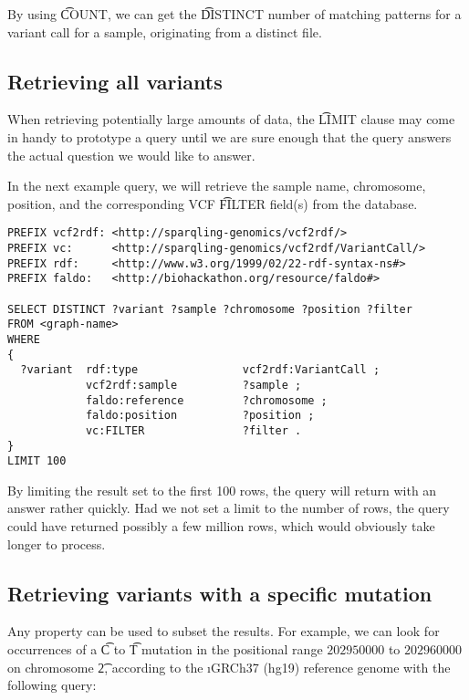   By using \t{COUNT}, we can get the \t{DISTINCT} number of
  matching patterns for a variant call for a sample, originating from
  a distinct file.

\subsection{Retrieving all variants}

  When retrieving potentially large amounts of data, the \t{LIMIT}
  clause may come in handy to prototype a query until we are sure enough
  that the query answers the actual question we would like to answer.

  In the next example query, we will retrieve the sample name,
  chromosome, position, and the corresponding VCF \t{FILTER} field(s)
  from the database.

\begin{lstlisting}[language=SPARQL]
PREFIX vcf2rdf: <http://sparqling-genomics/vcf2rdf/>
PREFIX vc:      <http://sparqling-genomics/vcf2rdf/VariantCall/>
PREFIX rdf:     <http://www.w3.org/1999/02/22-rdf-syntax-ns#>
PREFIX faldo:   <http://biohackathon.org/resource/faldo#>

SELECT DISTINCT ?variant ?sample ?chromosome ?position ?filter
FROM <graph-name>
WHERE
{
  ?variant  rdf:type                vcf2rdf:VariantCall ;
            vcf2rdf:sample          ?sample ;
            faldo:reference         ?chromosome ;
            faldo:position          ?position ;
            vc:FILTER               ?filter .
}
LIMIT 100
\end{lstlisting}

  By limiting the result set to the first 100 rows, the query will return
  with an answer rather quickly.  Had we not set a limit to the number of
  rows, the query could have returned possibly a few million rows, which
  would obviously take longer to process.

\subsection{Retrieving variants with a specific mutation}

  Any property can be used to subset the results.  For example, we can
  look for occurrences of a \t{C} to \t{T} mutation in the positional
  range $202950000$ to $202960000$ on chromosome \t{2}, according to the
  \i{GRCh37 (hg19)} reference genome with the following query:

